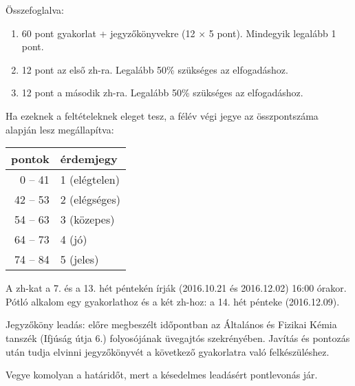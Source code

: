\documentclass{article}
\begin{document}
Összefoglalva:

\begin{enumerate}
\item 60 pont gyakorlat + jegyzőkönyvekre (12 $\times$ 5 pont).  Mindegyik legalább 1 pont.
\item 12 pont az első zh-ra. Legalább 50\% szükséges az elfogadáshoz.
\item 12 pont a második zh-ra. Legalább 50\% szükséges az elfogadáshoz. 
\end{enumerate}

Ha ezeknek a feltételeknek eleget tesz, a félév végi jegye az összpontszáma alapján lesz megállapítva:

\begin{center}
\begin{tabular}{|r|l|}
\hline
pontok & érdemjegy \\
\hline
0 -- 41 & 1 (elégtelen) \\
\hline
42 -- 53 & 2 (elégséges) \\
\hline
54 -- 63 & 3 (közepes) \\
\hline
64 -- 73 & 4 (jó) \\
\hline
74 -- 84 & 5 (jeles) \\
\hline
\end{tabular}
\end{center}

A zh-kat a 7. és a 13. hét péntekén írják (2016.10.21 és 2016.12.02) 16:00 órakor. Pótló alkalom egy gyakorlathoz és a két zh-hoz: a 14. hét pénteke (2016.12.09).

Jegyzőköny leadás: előre megbeszélt időpontban az Általános és Fizikai Kémia tanszék (Ifjúság útja 6.) folyosójának üvegajtós szekrényében. Javítás és pontozás után tudja elvinni jegyzőkönyvét a következő gyakorlatra való felkészüléshez.

Vegye komolyan a határidőt, mert a késedelmes leadásért pontlevonás jár.
\end{document}
